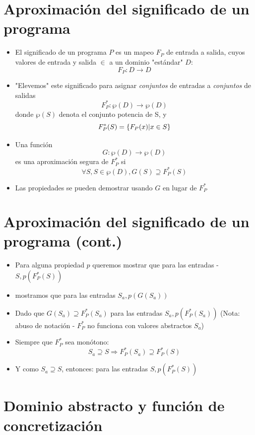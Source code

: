 \documentclass[11pt]{article}
\begin{document}
\section*{Aproximación del significado de un programa}
\label{sec:orgb355e45}

\begin{itemize}
\item El significado de un programa \(P\) es un mapeo \(F_P\) de entrada a
salida, cuyos valores de  entrada y salida \(\in\) a un dominio
"estándar" \(D\): $$F_P: D \rightarrow D$$
\item "Elevemos" este significado para asignar \emph{conjuntos} de entradas a
\emph{conjuntos} de salidas $$F^*_P: \wp(D) \rightarrow \wp(D)$$ donde \(\wp(S)\)
denota el conjunto potencia de S, y $$F_P^*(S) = \{F_P(x) \arrowvert x \in  S\}$$
\item Una función $$G: \wp(D) \rightarrow \wp(D)$$ es una aproximación segura de
\(F_P^*\) si  $$\forall S, S \in \wp(D), G(S) \supseteq F_P^*(S)$$
\item Las propiedades se pueden demostrar usando \(G\) en lugar de \(F_P^*\)
\end{itemize}

\section*{Aproximación del significado de un programa (cont.)}
\label{sec:org321dc84}

\begin{itemize}
\item Para alguna propiedad \(p\) queremos mostrar que para las
entradas - \(S, p(F_P^*(S))\)
\item mostramos que para las entradas \(S_a, p(G(S_a))\)
\item Dado que \(G(S_a) \supseteq F_P^*(S_a)\) para las entradas \(S_a, p(F_P^*(S_a))\)
(Nota: abuso de notación - \(F_P^*\) no funciona con valores abstractos \(S_a\))
\item Siempre que \(F_P^*\) sea monótono: $$S_a \supseteq S \Rightarrow F_P^*(S_a) \supseteq F_P^*(S)$$
\item Y como \(S_a \supseteq S\), entonces: para las entradas \(S, p(F_P^*(S))\)
\end{itemize}


\section*{Dominio abstracto y función de concretización}
\label{sec:orgae22660}
\end{document}
